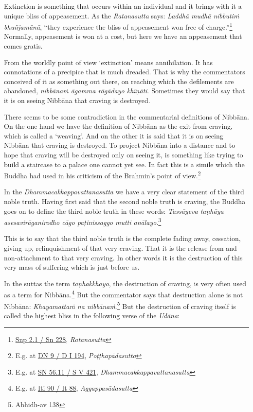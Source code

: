 Extinction is something that occurs within an individual and it brings with it a unique bliss of appeasement. As the \emph{Ratanasutta} says: \emph{Laddhā mudhā nibbutiṁ bhuñjamānā}, ``they experience the bliss of appeasement won free of charge.''\footnote{\href{https://suttacentral.net/snp2.1/pli/ms}{Snp 2.1 / Sn 228}, \emph{Ratanasutta}} Normally, appeasement is won at a cost, but here we have an appeasement that comes gratis.

From the worldly point of view `extinction' means annihilation. It has connotations of a precipice that is much dreaded. That is why the commentators conceived of it as something out there, on reaching which the defilements are abandoned, \emph{nibbānaṁ āgamma rāgādayo khīṇāti}. Sometimes they would say that it is on seeing Nibbāna that craving is destroyed.

There seems to be some contradiction in the commentarial definitions of Nibbāna. On the one hand we have the definition of Nibbāna as the exit from craving, which is called a `weaving'. And on the other it is said that it is on seeing Nibbāna that craving is destroyed. To project Nibbāna into a distance and to hope that craving will be destroyed only on seeing it, is something like trying to build a staircase to a palace one cannot yet see. In fact this is a simile which the Buddha had used in his criticism of the Brahmin's point of view.\footnote{E.g. at \href{https://suttacentral.net/dn9/pli/ms}{DN 9 / D I 194}, \emph{Poṭṭhapādasutta}}

In the \emph{Dhammacakkappavattanasutta} we have a very clear statement of the third noble truth. Having first said that the second noble truth is craving, the Buddha goes on to define the third noble truth in these words: \emph{Tassāyeva taṇhāya asesavirāganirodho cāgo paṭinissaggo mutti anālayo}.\footnote{E.g. at \href{https://suttacentral.net/sn56.11/pli/ms}{SN 56.11 / S V 421}, \emph{Dhammacakkappavattanasutta}}

This is to say that the third noble truth is the complete fading away, cessation, giving up, relinquishment of that very craving. That it is the release from and non-attachment to that very craving. In other words it is the destruction of this very mass of suffering which is just before us.

In the suttas the term \emph{taṇhakkhayo}, the destruction of craving, is very often used as a term for Nibbāna.\footnote{E.g. at \href{https://suttacentral.net/iti90/pli/ms}{Iti 90 / It 88}, \emph{Aggappasādasutta}} But the commentator says that destruction alone is not Nibbāna: \emph{Khayamattaṁ na nibbānaṁ}.\footnote{Abhidh-av 138} But the destruction of craving itself is called the highest bliss in the following verse of the \emph{Udāna}:

